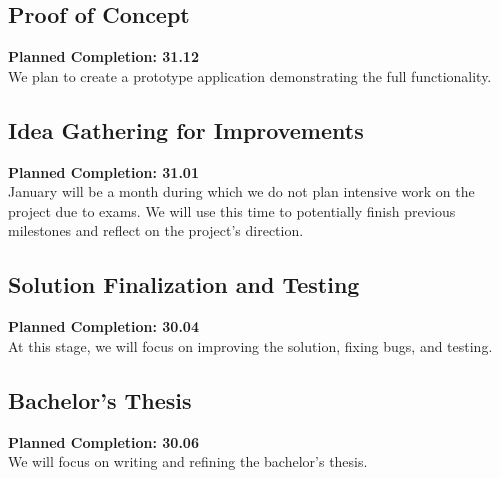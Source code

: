 \documentclass[12pt]{article}
\begin{document}
\subsection*{Proof of Concept}
\textbf{Planned Completion: 31.12}\\
We plan to create a prototype application demonstrating the full functionality.

\subsection*{Idea Gathering for Improvements}
\textbf{Planned Completion: 31.01}\\
January will be a month during which we do not plan intensive work on the project due to exams. We will use this time to potentially finish previous milestones and reflect on the project's direction.

\subsection*{Solution Finalization and Testing}
\textbf{Planned Completion: 30.04}\\
At this stage, we will focus on improving the solution, fixing bugs, and testing.

\subsection*{Bachelor's Thesis}
\textbf{Planned Completion: 30.06}\\
We will focus on writing and refining the bachelor's thesis.



\end{document}
